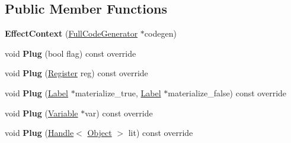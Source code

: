 \subsection*{Public Member Functions}
\begin{DoxyCompactItemize}
\item 
{\bfseries Effect\+Context} (\hyperlink{classv8_1_1internal_1_1_full_code_generator}{Full\+Code\+Generator} $\ast$codegen)\hypertarget{classv8_1_1internal_1_1_full_code_generator_1_1_effect_context_ab8e985bd7d97e90e9f66489ce31af3fe}{}\label{classv8_1_1internal_1_1_full_code_generator_1_1_effect_context_ab8e985bd7d97e90e9f66489ce31af3fe}

\item 
void {\bfseries Plug} (bool flag) const  override\hypertarget{classv8_1_1internal_1_1_full_code_generator_1_1_effect_context_a8b5d47fc279b30b554b189f406544bd4}{}\label{classv8_1_1internal_1_1_full_code_generator_1_1_effect_context_a8b5d47fc279b30b554b189f406544bd4}

\item 
void {\bfseries Plug} (\hyperlink{structv8_1_1internal_1_1_register}{Register} reg) const  override\hypertarget{classv8_1_1internal_1_1_full_code_generator_1_1_effect_context_a5cb00d40caaa26cee08c1699475bd977}{}\label{classv8_1_1internal_1_1_full_code_generator_1_1_effect_context_a5cb00d40caaa26cee08c1699475bd977}

\item 
void {\bfseries Plug} (\hyperlink{classv8_1_1internal_1_1_label}{Label} $\ast$materialize\+\_\+true, \hyperlink{classv8_1_1internal_1_1_label}{Label} $\ast$materialize\+\_\+false) const  override\hypertarget{classv8_1_1internal_1_1_full_code_generator_1_1_effect_context_a0c942e7f2eaab26b7aee44a9d455b698}{}\label{classv8_1_1internal_1_1_full_code_generator_1_1_effect_context_a0c942e7f2eaab26b7aee44a9d455b698}

\item 
void {\bfseries Plug} (\hyperlink{classv8_1_1internal_1_1_variable}{Variable} $\ast$var) const  override\hypertarget{classv8_1_1internal_1_1_full_code_generator_1_1_effect_context_a1cf01cc082677009e9e30df6025a5d91}{}\label{classv8_1_1internal_1_1_full_code_generator_1_1_effect_context_a1cf01cc082677009e9e30df6025a5d91}

\item 
void {\bfseries Plug} (\hyperlink{classv8_1_1internal_1_1_handle}{Handle}$<$ \hyperlink{classv8_1_1internal_1_1_object}{Object} $>$ lit) const  override\hypertarget{classv8_1_1internal_1_1_full_code_generator_1_1_effect_context_a5b56e56386db2a3cc16577c8f29b8f06}{}\label{classv8_1_1internal_1_1_full_code_generator_1_1_effect_context_a5b56e56386db2a3cc16577c8f29b8f06}


\end{DoxyCompactItemize}
